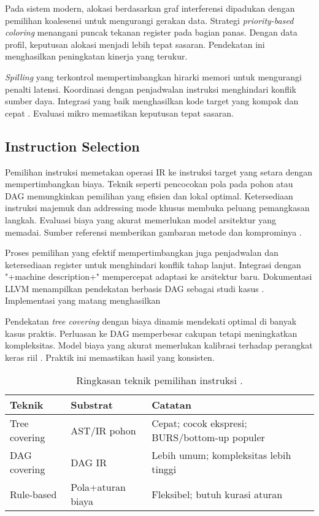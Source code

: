 \documentclass[../main.tex]{subfiles}
\begin{document}
Pada sistem modern, alokasi berdasarkan graf interferensi dipadukan dengan pemilihan koalesensi untuk mengurangi gerakan data. Strategi \emph{priority-based coloring} menangani puncak tekanan register pada bagian panas. Dengan data profil, keputusan alokasi menjadi lebih tepat sasaran. Pendekatan ini menghasilkan peningkatan kinerja yang terukur.

\emph{Spilling} yang terkontrol mempertimbangkan hirarki memori untuk mengurangi penalti latensi. Koordinasi dengan penjadwalan instruksi menghindari konflik sumber daya. Integrasi yang baik menghasilkan kode target yang kompak dan cepat \citep{WikiRegisterAllocation}. Evaluasi mikro memastikan keputusan tepat sasaran.

\subsection{Instruction Selection}
Pemilihan instruksi memetakan operasi IR ke instruksi target yang setara dengan mempertimbangkan biaya. Teknik seperti pencocokan pola pada pohon atau DAG memungkinkan pemilihan yang efisien dan lokal optimal. Ketersediaan instruksi majemuk dan addressing mode khusus membuka peluang pemangkasan langkah. Evaluasi biaya yang akurat memerlukan model arsitektur yang memadai. Sumber referensi memberikan gambaran metode dan komprominya \citep{WikiInstructionSelection}.

Proses pemilihan yang efektif mempertimbangkan juga penjadwalan dan ketersediaan register untuk menghindari konflik tahap lanjut. Integrasi dengan "+machine description+" mempercepat adaptasi ke arsitektur baru. Dokumentasi LLVM menampilkan pendekatan berbasis DAG sebagai studi kasus \citep{LLVMOverview}. Implementasi yang matang menghasilkan 

Pendekatan \emph{tree covering} dengan biaya dinamis mendekati optimal di banyak kasus praktis. Perluasan ke DAG memperbesar cakupan tetapi meningkatkan kompleksitas. Model biaya yang akurat memerlukan kalibrasi terhadap perangkat keras riil \citep{WikiInstructionSelection}. Praktik ini memastikan hasil yang konsisten.

\begin{table}[t]
  \centering
  \caption{Ringkasan teknik pemilihan instruksi \citep{WikiInstructionSelection,LLVMOverview}.}
  \label{tab:isel}
  \begin{tabular}{@{}lll@{}}
    \toprule
    Teknik & Substrat & Catatan \\
    \midrule
    Tree covering & AST/IR pohon & Cepat; cocok ekspresi; BURS/bottom-up populer \\
    DAG covering & DAG IR & Lebih umum; kompleksitas lebih tinggi \\
    Rule-based & Pola+aturan biaya & Fleksibel; butuh kurasi aturan \\
    \bottomrule
  \end{tabular}
\end{table}
\end{document}
